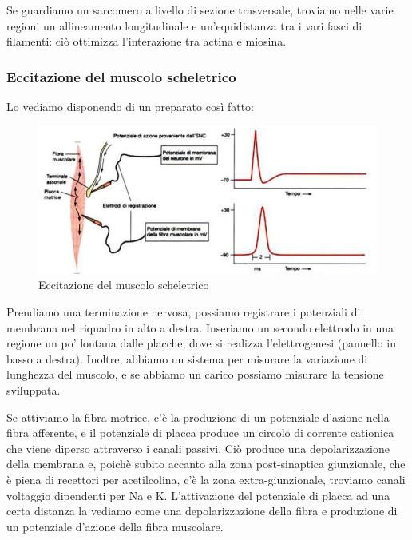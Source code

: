 \documentclass[a4paper,12pt]{article}
\begin{document}
Se guardiamo un sarcomero a livello di sezione trasversale, troviamo nelle varie regioni un allineamento longitudinale e un'equidistanza tra i vari fasci di filamenti: ciò ottimizza l'interazione tra actina e miosina. 

\subsubsection{Eccitazione del muscolo scheletrico}
Lo vediamo disponendo di un preparato così fatto:

\begin{figure}[H]
\centering
\includegraphics[scale=0.4]{immagine/eccitazione.jpg}
\caption{Eccitazione del muscolo scheletrico}
\end{figure}

Prendiamo una terminazione nervosa, possiamo registrare i potenziali di membrana nel riquadro in alto a destra. Inseriamo un secondo elettrodo in una regione un po' lontana dalle placche, dove si realizza l'elettrogenesi (pannello in basso a destra). Inoltre, abbiamo un sistema per misurare la variazione di lunghezza del muscolo, e se abbiamo un carico possiamo misurare la tensione sviluppata. 

Se attiviamo la fibra motrice, c'è la produzione di un potenziale d'azione nella fibra afferente, e il potenziale di placca produce un circolo di corrente cationica che viene diperso attraverso i canali passivi. Ciò produce una depolarizzazione della membrana e, poichè subito accanto alla zona post-sinaptica giunzionale, che è piena di recettori per acetilcolina, c'è la zona extra-giunzionale, troviamo canali voltaggio dipendenti per Na e K. L'attivazione del potenziale di placca ad una certa distanza la vediamo come una depolarizzazione della fibra e produzione di un potenziale d'azione della fibra muscolare.
\end{document}

